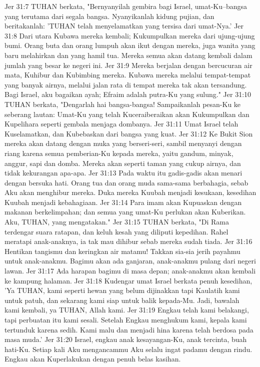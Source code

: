 Jer 31:7  TUHAN berkata, "Bernyanyilah gembira bagi Israel, umat-Ku--bangsa yang terutama dari segala bangsa. Nyanyikanlah kidung pujian, dan beritakanlah: 'TUHAN telah menyelamatkan yang tersisa dari umat-Nya.'
Jer 31:8  Dari utara Kubawa mereka kembali; Kukumpulkan mereka dari ujung-ujung bumi. Orang buta dan orang lumpuh akan ikut dengan mereka, juga wanita yang baru melahirkan dan yang hamil tua. Mereka semua akan datang kembali dalam jumlah yang besar ke negeri ini.
Jer 31:9  Mereka berjalan dengan bercucuran air mata, Kuhibur dan Kubimbing mereka. Kubawa mereka melalui tempat-tempat yang banyak airnya, melalui jalan rata di tempat mereka tak akan tersandung. Bagi Israel, aku bagaikan ayah; Efraim adalah putra-Ku yang sulung."
Jer 31:10  TUHAN berkata, "Dengarlah hai bangsa-bangsa! Sampaikanlah pesan-Ku ke seberang lautan: Umat-Ku yang telah Kuceraiberaikan akan Kukumpulkan dan Kupelihara seperti gembala menjaga dombanya.
Jer 31:11  Umat Israel telah Kuselamatkan, dan Kubebaskan dari bangsa yang kuat.
Jer 31:12  Ke Bukit Sion mereka akan datang dengan muka yang berseri-seri, sambil menyanyi dengan riang karena semua pemberian-Ku kepada mereka, yaitu gandum, minyak, anggur, sapi dan domba. Mereka akan seperti taman yang cukup airnya, dan tidak kekurangan apa-apa.
Jer 31:13  Pada waktu itu gadis-gadis akan menari dengan bersuka hati. Orang tua dan orang muda sama-sama berbahagia, sebab Aku akan menghibur mereka. Duka mereka Kuubah menjadi kesukaan, kesedihan Kuubah menjadi kebahagiaan.
Jer 31:14  Para imam akan Kupuaskan dengan makanan berkelimpahan; dan semua yang umat-Ku perlukan akan Kuberikan. Aku, TUHAN, yang mengatakan."
Jer 31:15  TUHAN berkata, "Di Rama terdengar suara ratapan, dan keluh kesah yang diliputi kepedihan. Rahel meratapi anak-anaknya, ia tak mau dihibur sebab mereka sudah tiada.
Jer 31:16  Hentikan tangismu dan keringkan air matamu! Takkan sia-sia jerih payahmu untuk anak-anakmu. Bagimu akan ada ganjaran, anak-anakmu pulang dari negeri lawan.
Jer 31:17  Ada harapan bagimu di masa depan; anak-anakmu akan kembali ke kampung halaman.
Jer 31:18  Kudengar umat Israel berkata penuh kesedihan, 'Ya TUHAN, kami seperti hewan yang belum dijinakkan tapi Kaulatih kami untuk patuh, dan sekarang kami siap untuk balik kepada-Mu. Jadi, bawalah kami kembali, ya TUHAN, Allah kami.
Jer 31:19  Engkau telah kami belakangi, tapi perbuatan itu kami sesali. Setelah Engkau menghukum kami, kepala kami tertunduk karena sedih. Kami malu dan menjadi hina karena telah berdosa pada masa muda.'
Jer 31:20  Israel, engkau anak kesayangan-Ku, anak tercinta, buah hati-Ku. Setiap kali Aku mengancammu Aku selalu ingat padamu dengan rindu. Engkau akan Kuperlakukan dengan penuh belas kasihan.
